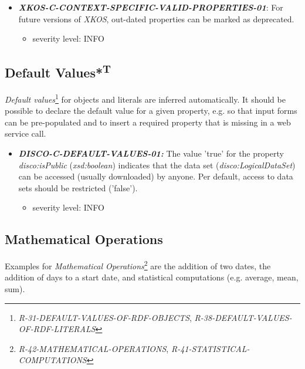 \documentclass{llncs}
\begin{document}
\begin{itemize}
	\item \textbf{{\em XKOS-C-CONTEXT-SPECIFIC-VALID-PROPERTIES-01}}: For future versions of \emph{XKOS}, out-dated properties can be marked as deprecated.
	\begin{itemize}
		\item severity level: INFO
	\end{itemize}
\end{itemize}

\subsection{Default Values*\textsuperscript{T}}

\emph{Default values}\footnote{{\em R-31-DEFAULT-VALUES-OF-RDF-OBJECTS}, {\em R-38-DEFAULT-VALUES-OF-RDF-LITERALS}} for objects and literals are inferred automatically.
It should be possible to declare the default value for a given property, e.g. so that input forms can be pre-populated and to insert a required property that is missing in a web service call.

\begin{itemize}
	\item \textbf{{\em DISCO-C-DEFAULT-VALUES-01:}}
The value 'true' for the property {\em disco:isPublic} ({\em xsd:boolean}) indicates that the data set ({\em disco:LogicalDataSet}) can be accessed (usually downloaded) by anyone.
Per default, access to data sets should be restricted ('false').
\begin{itemize}
		\item severity level: INFO
	\end{itemize}
\end{itemize}

\subsection{Mathematical Operations}

Examples for {\em Mathematical Operations}\footnote{{\em R-42-MATHEMATICAL-OPERATIONS}, {\em R-41-STATISTICAL-COMPUTATIONS}} are the addition of two dates, the addition of days to a start date, and statistical computations (e.g. average, mean, sum).
\end{document}
